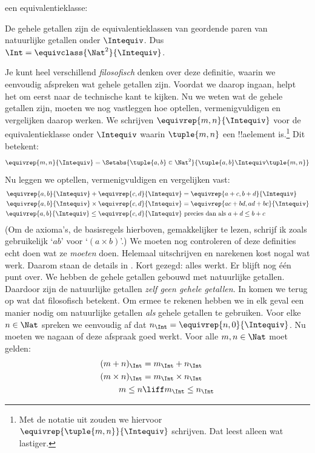 \documentclass[../../../include/open-logic-section]{subfiles}
\begin{document}
een equivalentieklasse:
\begin{defn}
		De gehele getallen zijn de equivalentieklassen van geordende paren
		van natuurlijke getallen onder $\Intequiv$. Dus $\Int =
		\equivclass{\Nat^2}{\Intequiv}$.
\end{defn}
Je kunt heel verschillend \emph{filosofisch} denken over deze
definitie, waarin we eenvoudig afspreken wat gehele getallen zijn.
Voordat we daarop ingaan, helpt het om eerst naar de technische kant te kijken.
Nu we weten wat de gehele getallen zijn, moeten we nog vastleggen hoe
optellen, vermenigvuldigen en vergelijken daarop werken. We schrijven
$\equivrep{m, n}{\Intequiv}$ voor de equivalentieklasse onder $\Intequiv$ waarin
$\tuple{m, n}$ een !!a{element} is.\footnote{Met de notatie uit
 zouden we hiervoor
$\equivrep{\tuple{m,n}}{\Intequiv}$ schrijven. Dat leest alleen wat
lastiger.} Dit betekent:
	$$\equivrep{m, n}{\Intequiv} = \Setabs{\tuple{a, b} \in \Nat^2}{\tuple{a, b}\Intequiv \tuple{m, n}}$$
Nu leggen we optellen, vermenigvuldigen en vergelijken vast:
	\begin{align*}
		\equivrep{a, b}{\Intequiv} + \equivrep{c, d}{\Intequiv} &= \equivrep{a + c, b + d}{\Intequiv}\\
		\equivrep{a, b}{\Intequiv} \times \equivrep{c, d}{\Intequiv} &= \equivrep{a c + b  d, a  d + b c}{\Intequiv}\\
		\equivrep{a, b}{\Intequiv} \leq \equivrep{c, d}{\Intequiv} &\text{ precies dan als }a + d \leq b + c
	\end{align*}	
(Om de axioma's, de basisregels hierboven, gemakkelijker te lezen,
schrijf ik zoals gebruikelijk `$ab$' voor `$(a \times b)$'.) We moeten
nog controleren of deze definities echt doen wat ze \emph{moeten} doen.
Helemaal uitschrijven en narekenen kost nogal wat werk. Daarom staan de
details in . Kort gezegd: alles werkt.
Er blijft nog één punt over. We hebben de gehele getallen gebouwd met
natuurlijke getallen. Daardoor zijn de natuurlijke getallen \emph{zelf
geen gehele getallen}. In  komen we terug op wat dat
filosofisch betekent. Om ermee te rekenen hebben we in elk geval een
manier nodig om natuurlijke getallen \emph{als} gehele getallen te
gebruiken. Voor elke $n \in \Nat$ spreken we eenvoudig af dat $n_\Int
= \equivrep{n, 0}{\Intequiv}$. Nu moeten we nagaan of deze
afspraak goed werkt. Voor alle $m, n \in \Nat$ moet gelden:
\begin{align*}
	(m + n)_\Int &= m_\Int + n_\Int\\
	(m \times n)_\Int &= m_\Int \times n_\Int\\
	m \leq n &\liff m_\Int \leq n_\Int
\end{align*}
\end{document}

